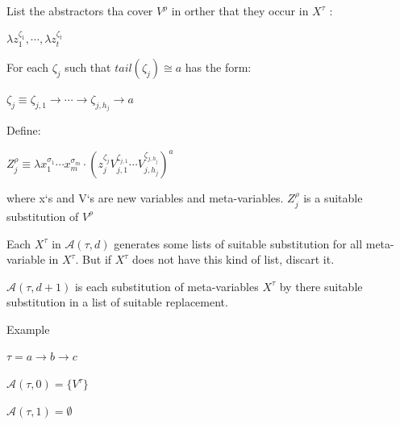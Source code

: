 \begin{frame}
     List the abstractors tha cover $V^{\rho}$ in orther that they
     occur in $X^{\tau}$ :

     \begin{center}
          $\lambda z^{\zeta_1}_1, \cdots, \lambda z^{\zeta_t}_t$
     \end{center}

     For each $\zeta_j$ such that $tail(\zeta_j) \cong a$ has the
     form:

     \begin{center}
           $\zeta_j \equiv \zeta_{j,1} \to \cdots \to \zeta_{j,h_j}
           \to a$
     \end{center}

     Define:
     \begin{center}
            $Z^{\rho}_j \equiv \lambda x^{\sigma_1}_1 \cdots x^{\sigma_m}_m
     \cdot (z^{\zeta_j}_j V^{\zeta_{j,1}}_{j,1} \cdots
     V^{\zeta_{j,h_j}}_{j,h_j})^a $
     \end{center}

     where x`s and V`s are new variables and
     meta-variables. $Z^{\rho}_j$ is a suitable substitution of $V^{\rho}$
\end{frame}

\begin{frame}
     Each $X^{\tau}$ in $\mathcal{A}(\tau,d)$ generates some lists of suitable
     substitution for all meta-variable in $X^{\tau}$. But if
     $X^{\tau}$ does not have this kind of list, discart it.

     $\mathcal{A}(\tau,d+1)$ is each substitution of meta-variables
     $X^{\tau}$ by there suitable substitution in a list of suitable replacement.
\end{frame}

\begin{frame}{Example}
  \begin{exa}
      $\tau = a \to b \to c$

      $\mathcal{A}(\tau,0) = \{V^{\tau}\}$

      $\mathcal{A}(\tau,1) = \emptyset$
  \end{exa}
\end{frame}

